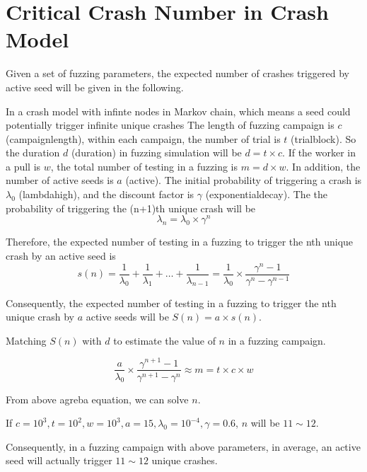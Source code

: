 \section{Critical Crash Number in Crash Model}

Given a set of fuzzing parameters, the expected number of crashes triggered
by active seed will be given in the following.

In a crash model with infinte nodes in Markov chain, which means a seed
could potentially trigger infinite unique crashes
The length of fuzzing campaign is $c$ (campaignlength), within each campaign,
the number of trial is $t$ (trialblock). So the duration $d$ (duration)
in fuzzing simulation will be $d = t \times c$. If the worker in a pull is $w$,
the total number of testing in a fuzzing is $m = d \times w$.
In addition, the number of active seeds is $a$ (active).
The initial probability of triggering a crash is $\lambda_0$ (lambdahigh), and
the discount factor is $\gamma$ (exponentialdecay). The the probability of 
triggering the (n+1)th unique crash will be 
\[
		\lambda_n = \lambda_0 \times \gamma^n
\]

Therefore, the expected number of testing in a fuzzing to trigger the nth 
unique crash by an active seed is
\[
		s(n) = \frac{1}{\lambda_0} + \frac{1}{\lambda_1} + \ldots + \frac{1}{\lambda_{n-1}}
			 = \frac{1}{\lambda_0} \times \frac{\gamma^{n} -1}{\gamma^{n} - \gamma^{n-1}}
\]

Consequently, the expected number of testing in a fuzzing to trigger the nth
unique crash by $a$ active seeds will be $S(n) = a \times s(n)$.

Matching $S(n)$ with $d$ to estimate the value of $n$ in a fuzzing campaign.

\[
		\frac{a}{\lambda_0} \times \frac{\gamma^{n+1} -1}{\gamma^{n+1} - \gamma^n} \approx m = t \times c \times w
\]

From above agreba equation, we can solve $n$.

If $c=10^3, t = 10^2, w= 10^3, a = 15, \lambda_0 = 10^{-4}, \gamma = 0.6$, 
$n$ will be $11 \sim 12$.

Consequently, in a fuzzing campaign with above parameters, in average, an
active seed will actually trigger $11 \sim 12$ unique crashes.


